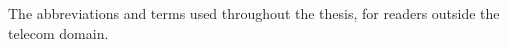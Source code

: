 \documentclass[english,oneside,a4paper,censored,csm,software-track-2020]{HYthesisML}
\begin{document}


\cleardoublepage %

\printbibliography

\backmatter
\begin{appendices}

The abbreviations and terms used throughout the thesis, for readers outside the telecom domain.


\end{appendices}
\end{document}

